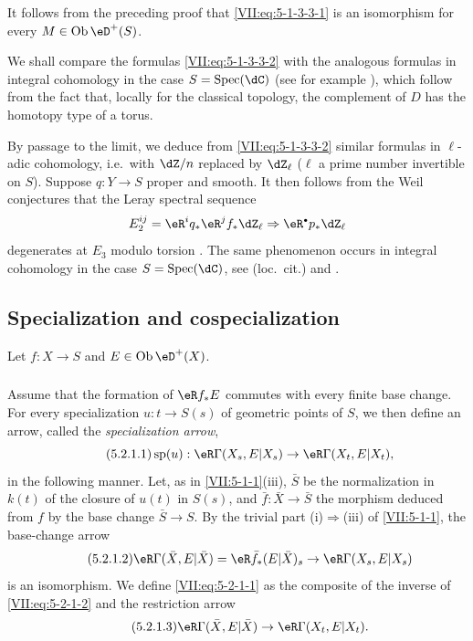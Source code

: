It follows from the preceding proof that \eqref{VII:eq:5-1-3-3-1}
is an isomorphism for every $M\in\ob\eD^+(S)$.

We shall compare the formulas \eqref{VII:eq:5-1-3-3-2} with the analogous formulas in
integral cohomology in the case $S=\spec(\dC)$ (see for example
\cite[3.1]{de71-2}), which follow from the fact that, locally for the
classical topology, the complement of $D$ has the homotopy type of a torus.

By passage to the limit, we deduce from \eqref{VII:eq:5-1-3-3-2} similar formulas
in $\ell$-adic cohomology, i.e.\ with $\dZ/n$ replaced by
$\dZ_\ell$ ($\ell$ a prime number invertible on $S$). Suppose
$q:Y\to S$ proper and smooth. It then follows from the Weil conjectures
\cite{de74,de80} that the Leray spectral sequence
\[
  E_2^{i j} = \eR^i q_\ast \eR^j f_\ast \dZ_\ell \Rightarrow \eR^\bullet p_\ast \dZ_\ell
\]
degenerates at $E_3$ modulo torsion \cite[\S 6]{de71-1}. The same
phenomenon occurs in integral cohomology in the case
$S=\spec(\dC)$, see (loc.\ cit.) and \cite[3.2.13]{de71-2}.




\subsection{Specialization and cospecialization}\label{VII:5-2}

Let $f:X\to S$ and $E\in\ob\eD^+(X)$.




\subsubsection{}\label{VII:5-2-1}

Assume that the formation of $\eR f_\ast E$ commutes with every finite base
change. For every specialization $u:t\to S(s)$ of geometric points
of $S$, we then define an arrow, called the \emph{specialization
arrow},
\begin{equation*}\tag{5.2.1.1}\label{VII:eq:5-2-1-1}
  \spe(u):\eR\Gamma(X_s,E|X_s) \to \eR\Gamma(X_t,E|X_t) \text{,}
\end{equation*}
in the following manner. Let, as in \ref{VII:5-1-1}(iii), $\bar S$ be the
normalization in $k(t)$ of the closure of $u(t)$ in $S(s)$, and
$\bar f:\bar X\to \bar S$ the morphism deduced from $f$ by the base
change $\bar S\to S$. By the trivial part (i)$\Rightarrow$(iii) of
\ref{VII:5-1-1}, the base-change arrow
\begin{equation*}\tag{5.2.1.2}\label{VII:eq:5-2-1-2}
  \eR\Gamma(\bar X,E|\bar X)=\eR\bar f_\ast (E|\bar X)_s \to \eR\Gamma(X_s,E|X_s)
\end{equation*}
is an isomorphism. We define \eqref{VII:eq:5-2-1-1} as the composite of
the inverse of \eqref{VII:eq:5-2-1-2} and the restriction arrow
\begin{equation*}\tag{5.2.1.3}\label{VII:eq:5-2-1-3}
  \eR\Gamma(\bar X,E|\bar X) \to \eR\Gamma(X_t,E|X_t) \text{.}
\end{equation*}




